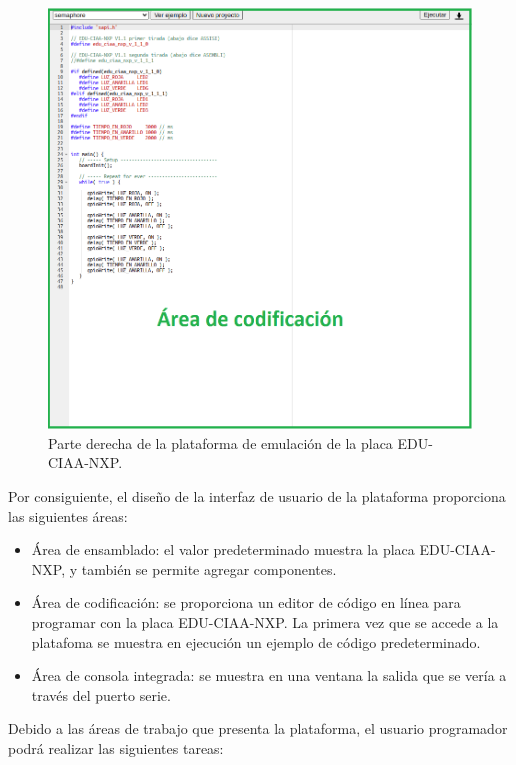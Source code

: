 \begin{figure}[ht]
	\centering
	\includegraphics[scale=.45]{./Figures/PlataformaEmulador3.png}
	\caption{Parte derecha de la plataforma de emulación de la placa EDU-CIAA-NXP.}
	\label{fig:PlataformaEmulador4}
\end{figure}

Por consiguiente, el diseño de la interfaz de usuario de la plataforma proporciona las siguientes áreas:

\begin{itemize}
	\item Área de ensamblado: el valor predeterminado muestra la placa EDU-CIAA-NXP, y también se permite agregar componentes.
	\item Área de codificación: se proporciona un editor de código en línea para programar con la placa EDU-CIAA-NXP. La primera vez que se accede a la platafoma se muestra en ejecución un ejemplo de código predeterminado.
	\item Área de consola integrada: se muestra en una ventana la salida que se vería a través del puerto serie. 
\end{itemize}


Debido a las áreas de trabajo que presenta la plataforma, el
usuario programador podrá realizar las siguientes tareas:

